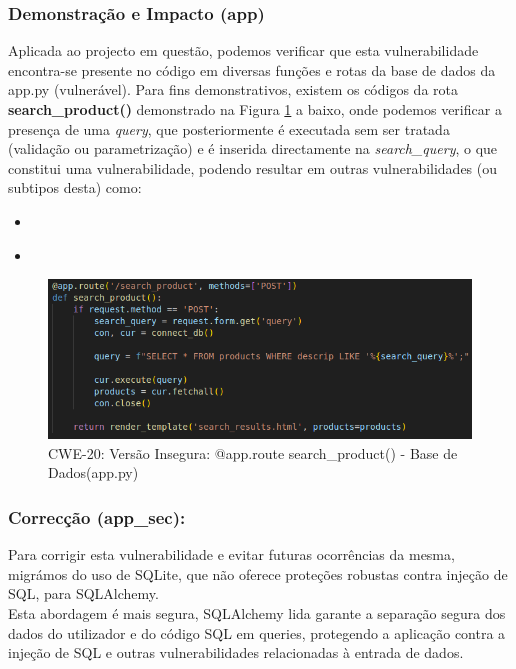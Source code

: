 \subsubsection{Demonstração e Impacto (app)}
Aplicada ao projecto em questão, podemos verificar que esta vulnerabilidade encontra-se presente no código em diversas funções e rotas da base de dados da app.py (vulnerável). Para fins demonstrativos, existem os códigos da rota \textbf{search\_product()} demonstrado na Figura \ref{fig:cwe20-cod1v} a baixo, onde podemos verificar a presença de uma \textit{query}, que posteriormente é executada sem ser tratada (validação ou parametrização) e é inserida directamente na \textit{search\_query}, o que constitui uma vulnerabilidade, podendo resultar em outras vulnerabilidades (ou subtipos desta) como:

    \begin{itemize}
        \item \textbf{}
        \item \textbf{}
    \end{itemize}

    \begin{figure}[H]
      \centering
      \includegraphics[width=16cm]{images/CWE-20_cod1v.png}
      \caption{CWE-20: Versão Insegura: @app.route search\_product() - Base de Dados(app.py)}
      \label{fig:cwe20-cod1v}
    \end{figure}
\subsubsection{Correcção (app\_sec):}
Para corrigir esta vulnerabilidade e evitar futuras ocorrências da mesma, migrámos do uso de SQLite, que não oferece proteções robustas contra injeção de SQL, para SQLAlchemy. \\

Esta abordagem é mais segura, SQLAlchemy lida garante a separação segura dos dados do utilizador e do código SQL em queries, protegendo a aplicação contra a injeção de SQL e outras vulnerabilidades relacionadas à entrada de dados. \\

